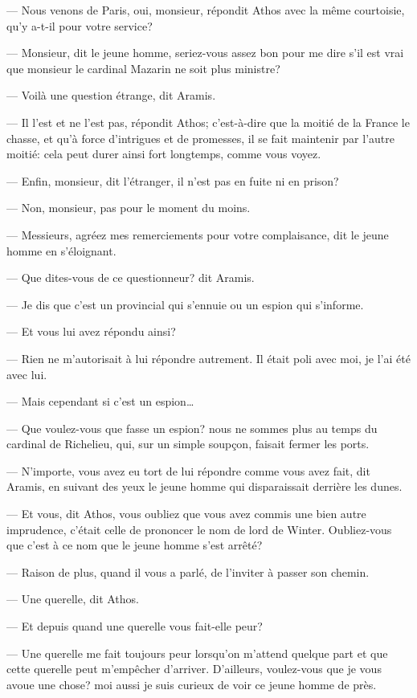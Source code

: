 — Nous venons de Paris, oui, monsieur, répondit Athos avec la même courtoisie, qu'y a-t-il pour votre service?

— Monsieur, dit le jeune homme, seriez-vous assez bon pour me dire s'il est vrai que monsieur le cardinal Mazarin ne soit plus ministre?

— Voilà une question étrange, dit Aramis.

— Il l'est et ne l'est pas, répondit Athos; c'est-à-dire que la moitié de la France le chasse, et qu'à force d'intrigues et de promesses, il se fait maintenir par l'autre moitié: cela peut durer ainsi fort longtemps, comme vous voyez.

— Enfin, monsieur, dit l'étranger, il n'est pas en fuite ni en prison?

— Non, monsieur, pas pour le moment du moins.

— Messieurs, agréez mes remerciements pour votre complaisance, dit le jeune homme en s'éloignant.

— Que dites-vous de ce questionneur? dit Aramis.

— Je dis que c'est un provincial qui s'ennuie ou un espion qui s'informe.

— Et vous lui avez répondu ainsi?

— Rien ne m'autorisait à lui répondre autrement. Il était poli avec moi, je l'ai été avec lui.

— Mais cependant si c'est un espion\dots

— Que voulez-vous que fasse un espion? nous ne sommes plus au temps du cardinal de Richelieu, qui, sur un simple soupçon, faisait fermer les ports.

— N'importe, vous avez eu tort de lui répondre comme vous avez fait, dit Aramis, en suivant des yeux le jeune homme qui disparaissait derrière les dunes.

— Et vous, dit Athos, vous oubliez que vous avez commis une bien autre imprudence, c'était celle de prononcer le nom de lord de Winter. Oubliez-vous que c'est à ce nom que le jeune homme s'est arrêté?

— Raison de plus, quand il vous a parlé, de l'inviter à passer son chemin.

— Une querelle, dit Athos.

— Et depuis quand une querelle vous fait-elle peur?

— Une querelle me fait toujours peur lorsqu'on m'attend quelque part et que cette querelle peut m'empêcher d'arriver. D'ailleurs, voulez-vous que je vous avoue une chose? moi aussi je suis curieux de voir ce jeune homme de près.

